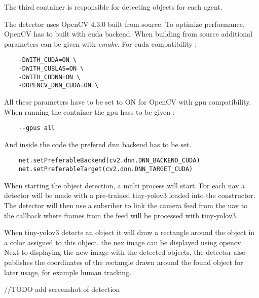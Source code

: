 The third container is responsible for detecting objects for each agent. 

The detector uses OpenCV 4.3.0 built from source. To optimize performance, OpenCV has to built with \acs{cuda} backend. When building from source
additional parameters can be given with \textit{cmake}. For cuda compatibility :

\begin{verbatim}
    -DWITH_CUDA=ON \
    -DWITH_CUBLAS=ON \
    -DWITH_CUDNN=ON \
    -DOPENCV_DNN_CUDA=ON \
\end{verbatim}

All these parameters have to be set to ON for OpenCV with \acs{gpu} compatibility. When running the container the \acs{gpu} hass to be given :

\begin{verbatim}
    --gpus all
\end{verbatim}

And inside the code the prefered dnn backend has to be set. 

\begin{verbatim}
    net.setPreferableBackend(cv2.dnn.DNN_BACKEND_CUDA)
    net.setPreferableTarget(cv2.dnn.DNN_TARGET_CUDA)
\end{verbatim}

When starting the object detection, a multi process will start. 
For each \acs{uav} a detector will be made with a pre-trained tiny-yolov3 loaded into the constructor. 
The detector will then use a subsriber 
to link the camera feed from the \acs{uav} to the callback where frames from the feed will be processed with tiny-yolov3. 

When tiny-yolov3 detects an object it will draw a rectangle around the object in a color assigned to this object. 
the nex image can be 
displayed using opencv. Next to displaying the new image with the detected objects, the detector also publishes 
the coordinates of the 
rectangle drawn around the found object for later usage, for example human tracking.

//TODO add screenshot of detection